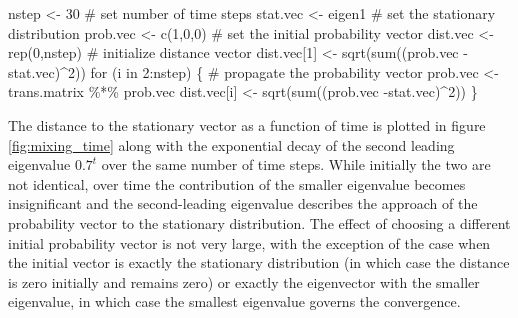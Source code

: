 \documentclass[
  letterpaper,
  DIV=11,
  numbers=noendperiod]{scrreprt}
\newenvironment{Shaded}{\begin{snugshade}}{\end{snugshade}}
\newcommand{\CommentTok}[1]{\textcolor[rgb]{0.37,0.37,0.37}{#1}}
\newcommand{\ControlFlowTok}[1]{\textcolor[rgb]{0.00,0.23,0.31}{#1}}
\newcommand{\DecValTok}[1]{\textcolor[rgb]{0.68,0.00,0.00}{#1}}
\newcommand{\FunctionTok}[1]{\textcolor[rgb]{0.28,0.35,0.67}{#1}}
\newcommand{\NormalTok}[1]{\textcolor[rgb]{0.00,0.23,0.31}{#1}}
\newcommand{\OtherTok}[1]{\textcolor[rgb]{0.00,0.23,0.31}{#1}}
\newcommand{\SpecialCharTok}[1]{\textcolor[rgb]{0.37,0.37,0.37}{#1}}
\begin{document}
\begin{Shaded}
\begin{Highlighting}[]
\NormalTok{nstep }\OtherTok{\textless{}{-}} \DecValTok{30} \CommentTok{\# set number of time steps}
\NormalTok{stat.vec }\OtherTok{\textless{}{-}}\NormalTok{ eigen1 }\CommentTok{\# set the stationary distribution}
\NormalTok{prob.vec }\OtherTok{\textless{}{-}} \FunctionTok{c}\NormalTok{(}\DecValTok{1}\NormalTok{,}\DecValTok{0}\NormalTok{,}\DecValTok{0}\NormalTok{) }
\CommentTok{\# set the initial probability vector}
\NormalTok{dist.vec }\OtherTok{\textless{}{-}} \FunctionTok{rep}\NormalTok{(}\DecValTok{0}\NormalTok{,nstep) }\CommentTok{\# initialize distance vector}
\NormalTok{dist.vec[}\DecValTok{1}\NormalTok{] }\OtherTok{\textless{}{-}} \FunctionTok{sqrt}\NormalTok{(}\FunctionTok{sum}\NormalTok{((prob.vec }\SpecialCharTok{{-}}\NormalTok{stat.vec)}\SpecialCharTok{\^{}}\DecValTok{2}\NormalTok{))}
\ControlFlowTok{for}\NormalTok{ (i }\ControlFlowTok{in} \DecValTok{2}\SpecialCharTok{:}\NormalTok{nstep) \{ }
  \CommentTok{\# propagate the probability vector}
\NormalTok{  prob.vec }\OtherTok{\textless{}{-}}\NormalTok{ trans.matrix }\SpecialCharTok{\%*\%}\NormalTok{ prob.vec}
\NormalTok{  dist.vec[i] }\OtherTok{\textless{}{-}} \FunctionTok{sqrt}\NormalTok{(}\FunctionTok{sum}\NormalTok{((prob.vec }\SpecialCharTok{{-}}\NormalTok{stat.vec)}\SpecialCharTok{\^{}}\DecValTok{2}\NormalTok{))}
\NormalTok{\}}
\end{Highlighting}
\end{Shaded}

The distance to the stationary vector as a function of time is plotted
in figure \ref{fig:mixing_time} along with the exponential decay of the
second leading eigenvalue \(0.7^t\) over the same number of time steps.
While initially the two are not identical, over time the contribution of
the smaller eigenvalue becomes insignificant and the second-leading
eigenvalue describes the approach of the probability vector to the
stationary distribution. The effect of choosing a different initial
probability vector is not very large, with the exception of the case
when the initial vector is exactly the stationary distribution (in which
case the distance is zero initially and remains zero) or exactly the
eigenvector with the smaller eigenvalue, in which case the smallest
eigenvalue governs the convergence.
\end{document}
